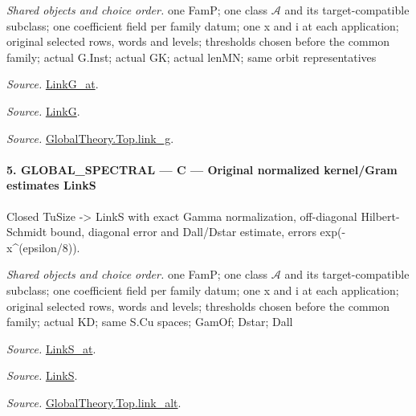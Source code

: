 \emph{Shared objects and choice order.} one FamP; one class $\mathcal A$ and its target-compatible subclass; one coefficient field per family datum; one x and i at each application; original selected rows, words and levels; thresholds chosen before the common family; actual G.Inst; actual GK; actual lenMN; same orbit representatives

\emph{Source.} \href{https://github.com/CocoSgt/riemann-hypothesis-lean/blob/7cbf7a0c32fca1badf05931879a37c3f8a2b03b4/src/Formalism/SharpRestriction/GlobalTheoremInputs.lean#L122-L137}{LinkG\_\allowbreak at}.

\emph{Source.} \href{https://github.com/CocoSgt/riemann-hypothesis-lean/blob/7cbf7a0c32fca1badf05931879a37c3f8a2b03b4/src/Formalism/SharpRestriction/GlobalTheoremInputs.lean#L138-L141}{LinkG}.

\emph{Source.} \href{https://github.com/CocoSgt/riemann-hypothesis-lean/blob/7cbf7a0c32fca1badf05931879a37c3f8a2b03b4/src/Development/AbelianVarietyTheory/Proofs/GlobalInterpolation/LinkG.lean#L14-L27}{GlobalTheory.Top.link\_\allowbreak g}.



\paragraph{5. GLOBAL\_\allowbreak SPECTRAL — C — Original normalized kernel/Gram estimates LinkS}

Closed TuSize -> LinkS with exact Gamma normalization, off-diagonal Hilbert-Schmidt bound, diagonal error and Dall/Dstar estimate, errors exp(-x\textasciicircum{}(epsilon/8)).

\emph{Shared objects and choice order.} one FamP; one class $\mathcal A$ and its target-compatible subclass; one coefficient field per family datum; one x and i at each application; original selected rows, words and levels; thresholds chosen before the common family; actual KD; same S.Cu spaces; GamOf; Dstar; Dall

\emph{Source.} \href{https://github.com/CocoSgt/riemann-hypothesis-lean/blob/7cbf7a0c32fca1badf05931879a37c3f8a2b03b4/src/Formalism/SharpRestriction/GlobalTheoremInputs.lean#L145-L149}{LinkS\_\allowbreak at}.

\emph{Source.} \href{https://github.com/CocoSgt/riemann-hypothesis-lean/blob/7cbf7a0c32fca1badf05931879a37c3f8a2b03b4/src/Formalism/SharpRestriction/GlobalTheoremInputs.lean#L152-L157}{LinkS}.

\emph{Source.} \href{https://github.com/CocoSgt/riemann-hypothesis-lean/blob/7cbf7a0c32fca1badf05931879a37c3f8a2b03b4/src/Development/AbelianVarietyTheory/Proofs/GlobalInterpolation/LinkAlt.lean#L16-L50}{GlobalTheory.Top.link\_\allowbreak alt}.



